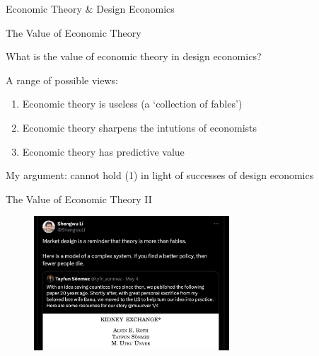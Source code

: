 \documentclass[aspectratio=169,xcolor=dvipsnames]{beamer}
\newcounter{fig}
\begin{document}
\begin{frame}

    \vspace{10mm}
    {\Large{\centerline{Economic Theory \& Design Economics}}}

\end{frame}


\begin{frame}{The Value of Economic Theory}

What is the value of economic theory in design economics?

\vspace{5mm}
A range of possible views:
\begin{enumerate}
    \item Economic theory is useless (a `collection of fables') \autocite{rubinstein2006,rubinstein2012}
    \item Economic theory sharpens the intutions of economists \autocite{roth2019}
    \item Economic theory has predictive value \autocite{friedman1953}
\end{enumerate}

\vspace{5mm}
{\color{red}My argument: cannot hold (1) in light of successes of design economics}

\end{frame}


\begin{frame}{The Value of Economic Theory II}

\begin{figure}[H]
    \begin{center}
    \includegraphics[width=0.65\textwidth]{shengwu_fables.png}
    \end{center}
    
\end{figure}

\end{frame}
\end{document}

